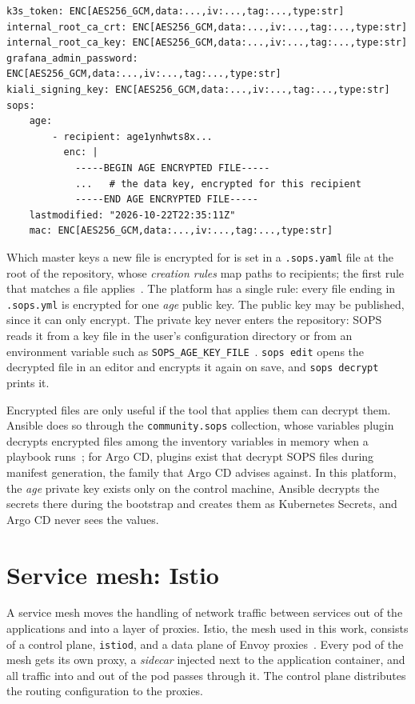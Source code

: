 \begin{lstlisting}[caption={Structure of the SOPS-encrypted secrets file of the platform (values shortened).},label=lst:SopsFile]
k3s_token: ENC[AES256_GCM,data:...,iv:...,tag:...,type:str]
internal_root_ca_crt: ENC[AES256_GCM,data:...,iv:...,tag:...,type:str]
internal_root_ca_key: ENC[AES256_GCM,data:...,iv:...,tag:...,type:str]
grafana_admin_password: ENC[AES256_GCM,data:...,iv:...,tag:...,type:str]
kiali_signing_key: ENC[AES256_GCM,data:...,iv:...,tag:...,type:str]
sops:
    age:
        - recipient: age1ynhwts8x...
          enc: |
            -----BEGIN AGE ENCRYPTED FILE-----
            ...   # the data key, encrypted for this recipient
            -----END AGE ENCRYPTED FILE-----
    lastmodified: "2026-10-22T22:35:11Z"
    mac: ENC[AES256_GCM,data:...,iv:...,tag:...,type:str]
\end{lstlisting}

Which master keys a new file is encrypted for is set in a \texttt{.sops.yaml} file at the root of the repository, whose \emph{creation rules} map paths to recipients; the first rule that matches a file applies~\cite{SOPSDocs}. The platform has a single rule: every file ending in \texttt{.sops.yml} is encrypted for one \textit{age} public key. The public key may be published, since it can only encrypt. The private key never enters the repository: SOPS reads it from a key file in the user's configuration directory or from an environment variable such as \texttt{SOPS\_AGE\_KEY\_FILE}~\cite{SOPSDocs}. \texttt{sops edit} opens the decrypted file in an editor and encrypts it again on save, and \texttt{sops decrypt} prints it.

Encrypted files are only useful if the tool that applies them can decrypt them. Ansible does so through the \texttt{community.sops} collection, whose variables plugin decrypts encrypted files among the inventory variables in memory when a playbook runs~\cite{CommunitySops}; for Argo CD, plugins exist that decrypt SOPS files during manifest generation, the family that Argo CD advises against. In this platform, the \textit{age} private key exists only on the control machine, Ansible decrypts the secrets there during the bootstrap and creates them as Kubernetes Secrets, and Argo CD never sees the values.

\section{Service mesh: Istio}
\label{sec:BgIstio}
A service mesh moves the handling of network traffic between services out of the applications and into a layer of proxies. Istio, the mesh used in this work, consists of a control plane, \texttt{istiod}, and a data plane of Envoy proxies~\cite{IstioArchitecture}. Every pod of the mesh gets its own proxy, a \emph{sidecar} injected next to the application container, and all traffic into and out of the pod passes through it. The control plane distributes the routing configuration to the proxies.

